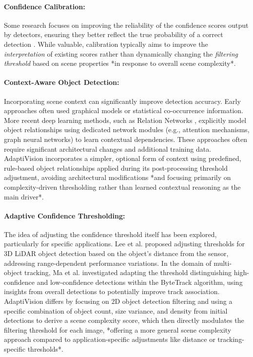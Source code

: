 \documentclass{article}
\begin{document}
\paragraph{Confidence Calibration:} Some research focuses on improving the reliability of the confidence scores output by detectors, ensuring they better reflect the true probability of a correct detection \cite{Calibration}. While valuable, calibration typically aims to improve the \textit{interpretation} of existing scores rather than dynamically changing the \textit{filtering threshold} based on scene properties *in response to overall scene complexity*.

\paragraph{Context-Aware Object Detection:} Incorporating scene context can significantly improve detection accuracy. Early approaches often used graphical models or statistical co-occurrence information. More recent deep learning methods, such as Relation Networks \cite{RelationNet}, explicitly model object relationships using dedicated network modules (e.g., attention mechanisms, graph neural networks) to learn contextual dependencies. These approaches often require significant architectural changes and additional training data. AdaptiVision incorporates a simpler, optional form of context using predefined, rule-based object relationships applied during its post-processing threshold adjustment, avoiding architectural modifications *and focusing primarily on complexity-driven thresholding rather than learned contextual reasoning as the main driver*.

\paragraph{Adaptive Confidence Thresholding:} The idea of adjusting the confidence threshold itself has been explored, particularly for specific applications. Lee et al. \cite{LeeLiDARAdapt} proposed adjusting thresholds for 3D LiDAR object detection based on the object's distance from the sensor, addressing range-dependent performance variations. In the domain of multi-object tracking, Ma et al. \cite{MaByteTrackAdapt} investigated adapting the threshold distinguishing high-confidence and low-confidence detections within the ByteTrack algorithm, using insights from overall detections to potentially improve track association. AdaptiVision differs by focusing on 2D object detection filtering and using a specific combination of object count, size variance, and density from initial detections to derive a scene complexity score, which then directly modulates the filtering threshold for each image, *offering a more general scene complexity approach compared to application-specific adjustments like distance or tracking-specific thresholds*.
\end{document}
